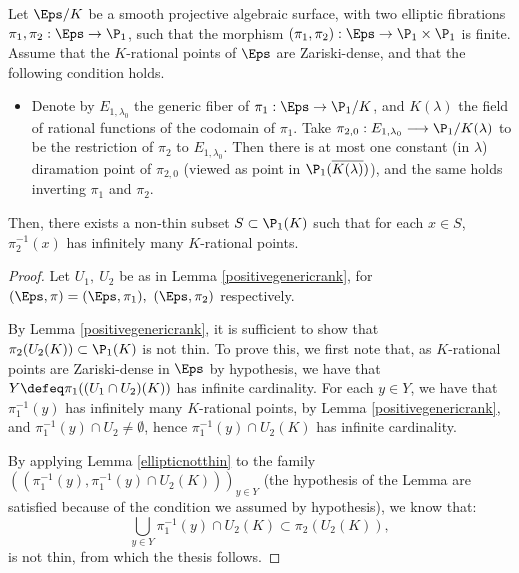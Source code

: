 \begin{lemma}\label{twofibrations}
	Let $\Eps/K$ be a smooth projective algebraic surface, with two elliptic fibrations $\pi_1,\pi_2:\Eps \rightarrow \P_1$, such that the morphism $(\pi_1,\pi_2):\Eps \rightarrow \P_1 \times \P_1$ is finite. Assume that the $K$-rational points of $\Eps$ are Zariski-dense, and that the following condition holds.
	\begin{itemize}\label{genericramification}
		\item Denote by $E_{1,\lambda_0}$ the generic fiber of $\pi_1:\Eps \rightarrow \P_1/K$, and $K(\lambda)$ the field of rational functions of the codomain of $\pi_1$. Take $\pi_{2,0}:E_{1,\lambda_0}\longrightarrow \P_1/{K(\lambda)}$ to be the restriction of $\pi_2$ to $E_{1,\lambda_0}$. Then there is at most one constant (in $\lambda$) diramation point of $\pi_{2,0}$ (viewed as point in $\P_1(\overline{{K(\lambda)}})$), and the same holds inverting $\pi_1$ and $\pi_2$.
	\end{itemize}
	Then, there exists a non-thin subset $S \subset \P_1(K)$ such that for each $x \in S$, $\pi_2^{-1}(x)$ has infinitely many $K$-rational points.
\end{lemma}
\begin{proof}
	Let $U_1, \ U_2$ be as in Lemma \ref{positivegenericrank}, for $(\Eps,\pi)=(\Eps,\pi_1), \ (\Eps, \pi_2)$ respectively.
	
	By Lemma \ref{positivegenericrank}, it is sufficient to show that $\pi_2(U_2(K))\subset \P_1(K)$ is not thin. To prove this, we first note that, as $K$-rational points are Zariski-dense in $\Eps$ by hypothesis, we have that $Y \defeq \pi_1((U_1 \cap U_2)(K))$ has infinite cardinality. For each $y \in Y$, we have that $\pi_1^{-1}(y)$ has infinitely many $K$-rational points, by Lemma \ref{positivegenericrank}, and $\pi_1^{-1}(y)\cap U_2 \neq \emptyset$, hence $\pi_1^{-1}(y)\cap U_2(K)$ has infinite cardinality.
	
	By applying Lemma \ref{ellipticnotthin} to the family $((\pi_1^{-1}(y),\pi_1^{-1}(y)\cap U_2(K)))_{y \in Y}$ (the hypothesis of the Lemma are satisfied because of the condition we assumed by hypothesis), we know that:
	\begin{equation*}
	\bigcup_{y\in Y} \pi_1^{-1}(y)\cap U_2(K) \subset \pi_2(U_2(K)),
	\end{equation*}
	is not thin, from which the thesis follows.
\end{proof}

